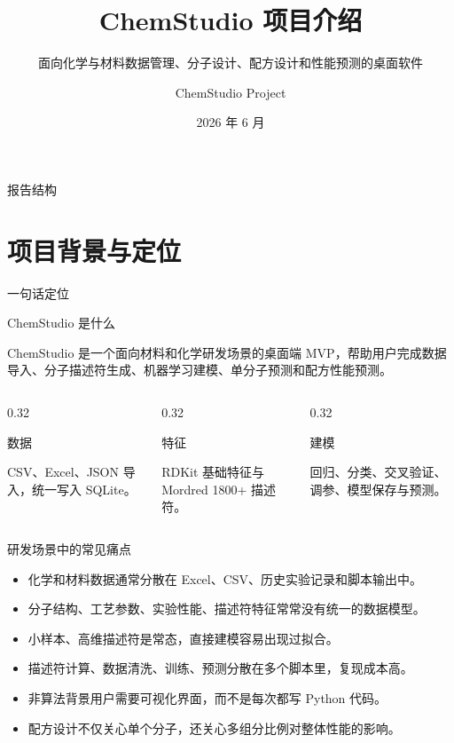 \documentclass[aspectratio=169,11pt]{beamer}
\title[ChemStudio]{ChemStudio 项目介绍}
\subtitle{面向化学与材料数据管理、分子设计、配方设计和性能预测的桌面软件}
\author{ChemStudio Project}
\institute{Python + PySide6 + SQLite + RDKit/Mordred + scikit-learn}
\date{2026 年 6 月}
\newenvironment{templatebox}[1]{%
  \begin{beamerboxesrounded}[upper=block title,lower=block body,shadow=false]{#1}%
  \small
}{%
  \end{beamerboxesrounded}%
}
\begin{document}
\begin{frame}
  \titlepage
\end{frame}

\begin{frame}{报告结构}
  \tableofcontents
\end{frame}

\section{项目背景与定位}

\begin{frame}{一句话定位}
  \begin{templatebox}{ChemStudio 是什么}
    ChemStudio 是一个面向材料和化学研发场景的桌面端 MVP，帮助用户完成数据导入、分子描述符生成、机器学习建模、单分子预测和配方性能预测。
  \end{templatebox}

  \vspace{0.4cm}
  \begin{columns}
    \begin{column}{0.32\textwidth}
      \begin{templatebox}{数据}
        CSV、Excel、JSON 导入，统一写入 SQLite。
      \end{templatebox}
    \end{column}
    \begin{column}{0.32\textwidth}
      \begin{templatebox}{特征}
        RDKit 基础特征与 Mordred 1800+ 描述符。
      \end{templatebox}
    \end{column}
    \begin{column}{0.32\textwidth}
      \begin{templatebox}{建模}
        回归、分类、交叉验证、调参、模型保存与预测。
      \end{templatebox}
    \end{column}
  \end{columns}
\end{frame}

\begin{frame}{研发场景中的常见痛点}
  \begin{itemize}
    \item 化学和材料数据通常分散在 Excel、CSV、历史实验记录和脚本输出中。
    \item 分子结构、工艺参数、实验性能、描述符特征常常没有统一的数据模型。
    \item 小样本、高维描述符是常态，直接建模容易出现过拟合。
    \item 描述符计算、数据清洗、训练、预测分散在多个脚本里，复现成本高。
    \item 非算法背景用户需要可视化界面，而不是每次都写 Python 代码。
    \item 配方设计不仅关心单个分子，还关心多组分比例对整体性能的影响。
  \end{itemize}
\end{frame}
\end{document}
